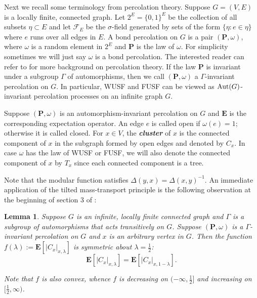 \documentclass[12pt]{article}
\newtheorem{lemma}[theorem]{Lemma}
\numberwithin{equation}{section}
\newcommand{\1}{\mathbf{1}}
\newcommand{\notion}[1]{{\bf  \textit{#1}}}
\begin{document}
 Next we recall some terminology from percolation theory. Suppose $G=(V,E)$ is a locally finite, connected graph. Let $2^E=\{0,1\}^E$ be the collection of all subsets $\eta\subset E$ and let $\mathcal{F}_E$ be the $\sigma$-field generated by sets of the form $\{\eta:e\in\eta\}$ where $e$ runs over all edges in $E$.  A bond percolation on $G$ is a pair $(\mathbf{P},\omega)$, where $\omega$ is a random element in $2^E$ and $\mathbf{P}$ is the law of $\omega$. For simplicity sometimes we will just say $\omega$ is a bond percolation. The interested reader can refer to \cite[Chapter 7 and 8]{LP2016} for more background on percolation theory. If the law $\mathbf{P}$ is invariant under a subgroup $\Gamma$ of automorphisms, then we call $(\mathbf{P},\omega)$ a $\Gamma$-invariant percolation on $G$. In particular, WUSF and FUSF can be viewed as $\textnormal{Aut}(G)$-invariant percolation processes on an infinite graph $G$.  
 
 
 Suppose $(\mathbf{P},\omega)$ is an automorphism-invariant percolation on $G$ and $\mathbf{E}$ is the corresponding expectation operator. An edge $e$ is called open if $\omega(e)=1$; otherwise it is called closed. For $x\in V$, the \notion{cluster} of $x$ is the connected component of $x$ in the subgraph formed by open edges and denoted by $C_x$. In  case $\omega$ has the law of WUSF or FUSF, we will also denote the connected component of $x$ by $T_x$ since each connected component is a tree. 
 
 Note that the modular function satisfies $\Delta(y,x)=\Delta(x,y)^{-1}$. An immediate application of the tilted mass-transport principle is the following observation at the beginning of section 3 of \cite{Tom2017}: 
 \begin{lemma}\label{lem:convex and symmetry}
 	Suppose $G$ is an infinite, locally finite connected graph and $\Gamma$ is a subgroup of automorphisms that acts transitively on $G$. Suppose $(\mathbf{P},\omega)$ is a $\Gamma$-invariant percolation on $G$ and $x$ is an arbitrary vertex in $G$. Then the function $f(\lambda):=\mathbf{E}[|C_x|_{x,\lambda}]$ is symmetric about $\lambda=\frac{1}{2}$:
 	\[
 	\mathbf{E}[|C_x|_{x,\lambda}]=\mathbf{E}[|C_x|_{x,1-\lambda}].
 	\] 
 	
 	Note that $f$ is also convex, whence $f$ is decreasing on $(-\infty,\frac{1}{2}]$ and increasing on $[\frac{1}{2},\infty)$.
 \end{lemma}
  
 
 
 
\end{document}

